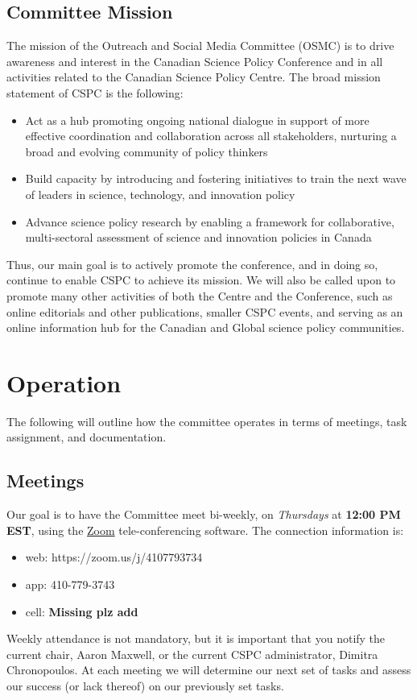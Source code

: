 \documentclass[11pt]{amsart}
\newcommand{\currentChair}{Aaron Maxwell}
\newcommand{\currentAdmin}{Dimitra Chronopoulos}
\begin{document}
\subsection{Committee Mission}
The mission of the Outreach and Social Media Committee (OSMC) is to drive awareness and interest in the Canadian Science Policy Conference and in all activities related to the Canadian Science Policy Centre.
The broad mission statement of CSPC is the following:
\begin{itemize}
\item Act as a hub promoting ongoing national dialogue in support of more effective coordination and collaboration across all stakeholders, nurturing a broad and evolving community of policy thinkers
\item Build capacity by introducing and fostering initiatives to train the next wave of leaders in science, technology, and innovation policy
\item Advance science policy research by enabling a framework for collaborative, multi-sectoral assessment of science and innovation policies in Canada
\end{itemize}
Thus, our main goal is to actively promote the conference, and in doing so, continue to enable CSPC to achieve its mission.
We will also be called upon to promote many other activities of both the Centre and the Conference, such as online editorials and other publications, smaller CSPC events, and serving as an online information hub for the Canadian and Global science policy communities.
\section{Operation}
The following will outline how the committee operates in terms of meetings, task assignment, and documentation.
\subsection{Meetings}
Our goal is to have the Committee meet bi-weekly, on \emph{Thursdays} at \textbf{12:00 PM EST}, using the \href{https://www.zoom.us/}{Zoom} tele-conferencing software.
The connection information is:
\begin{itemize}
\item web: https://zoom.us/j/4107793734
\item app: 410-779-3743
\item cell: \textbf{Missing plz add}
\end{itemize}
Weekly attendance is not mandatory, but it is important that you notify the current chair, \currentChair, or the current CSPC administrator, \currentAdmin.
At each meeting we will determine our next set of tasks and assess our success (or lack thereof) on our previously set tasks.
\end{document}
